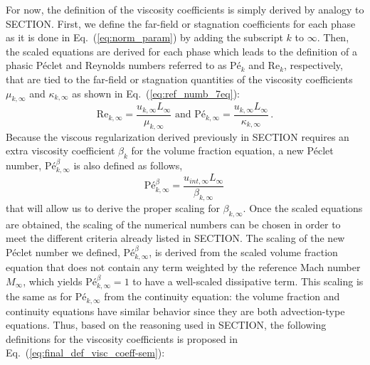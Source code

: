 \documentclass[preprint,10pt]{elsarticle}
\renewcommand{\Re}{\textrm{Re}}
\newcommand{\Pe}{\textrm{P\'e}}
\newcommand{\eqt}[1]{Eq.~(\ref{#1})}                     %
\begin{document}
For now, the definition of the viscosity coefficients is simply derived by analogy to SECTION. First, we define the far-field or stagnation coefficients for each phase as it is done in \eqt{eq:norm_param} by adding the subscript $k$ to $\infty$. Then, the scaled equations are derived for each phase which leads to the definition of a phasic P\'eclet and Reynolds numbers referred to as $\Pe_k$ and $\Re_k$, respectively, that are tied to the far-field or stagnation quantities of the viscosity coefficients $\mu_{k,\infty}$ and $\kappa_{k,\infty}$ as shown in \eqt{eq:ref_numb_7eq}:
%  
\begin{equation}
\label{eq:ref_numb_7eq}
\Re_{k,\infty} = \frac{u_{k,\infty} L_\infty}{\mu_{k,\infty}} \text{ and }
\Pe_{k,\infty} = \frac{u_{k,\infty} L_\infty}{\kappa_{k,\infty}} \, .
\end{equation}
%
Because the viscous regularization derived previously in SECTION requires an extra viscosity coefficient $\beta_k$ for the volume fraction equation, a new P\'eclet number, $\Pe_{k,\infty}^\beta$ is also defined as follows,
%
\begin{equation}
\label{eq:ref_numb_7eq_beta}
\Pe_{k,\infty}^\beta = \frac{u_{int,\infty} L_\infty}{\beta_{k,\infty}} \,
\end{equation}
%
that will allow us to derive the proper scaling for $\beta_{k,\infty}$. Once the scaled equations are obtained, the scaling of the numerical numbers can be chosen in order to meet the different criteria already listed in SECTION. The scaling of the new P\'eclet number we defined, $\Pe_{k,\infty}^\beta$, is derived from the scaled volume fraction equation that does not contain any term weighted by the reference Mach number $M_\infty$, which yields $\Pe_{k,\infty}^\beta=1$ to have a well-scaled dissipative term. This scaling is the same as for $\Pe_{k,\infty}$ from the continuity equation: the volume fraction and continuity equations have similar behavior since they are both advection-type equations. Thus, based on the reasoning used in SECTION, the following definitions for the viscosity coefficients is proposed in \eqt{eq:final_def_visc_coeff-sem}: 
%
\end{document}
